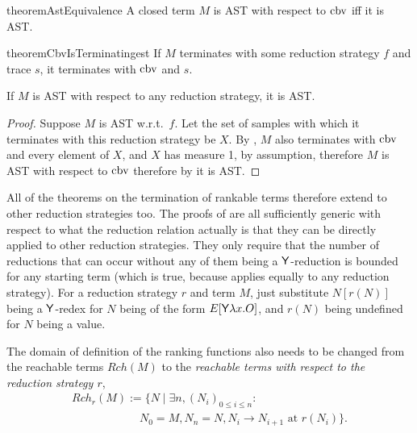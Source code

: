 \begin{restatable}{theorem}{AstEquivalence} \label{thm:AstEquivalence}
A closed term $M$ is AST with respect to $\operatorname{cbv}$ iff it is AST.
\end{restatable}

\begin{restatable}{theorem}{CbvIsTerminatingest} \label{thm:CbvIsTerminatingest}
If $M$ terminates with some reduction strategy $f$ and trace $s$, it terminates with $\operatorname{cbv}$ and $s$.
\end{restatable}

\begin{corollary}
\label{cor:Reduction strategy independence}
If $M$ is AST with respect to any reduction strategy, it is AST.
\end{corollary}
\begin{proof}
Suppose $M$ is AST w.r.t.~$f$. Let the set of samples with which it terminates with this reduction strategy be $X$. By , $M$ also terminates with $\operatorname{cbv}$ and every element of $X$, and $X$ has measure 1, by assumption, therefore $M$ is AST with respect to $\operatorname{cbv}$ therefore by  it is AST.
\end{proof}

All of the theorems on the termination of rankable terms therefore extend to other reduction strategies too. The proofs of  are all sufficiently generic with respect to what the reduction relation actually is that they can be directly applied to other reduction strategies. They only require that the number of reductions that can occur without any of them being a $\mathsf{Y}$-reduction is bounded for any starting term (which is true, because  applies equally to any reduction strategy). For a reduction strategy $r$ and term $M$, just substitute $N[r(N)]$ being a $\mathsf{Y}$-redex for $N$ being of the form $E[\mathsf{Y} \lambda x. O]$, and $r(N)$ being undefined for $N$ being a value.

The domain of definition of the ranking functions also needs to be changed from the reachable terms $\mathit{Rch}(M)$ to the \emph{reachable terms with respect to the reduction strategy $r$},
\[
\begin{array}{l}
\mathit{Rch}_r(M) := \{N \mid \exists n, (N_i)_{0 \leq i \leq n} : {}\\
\qquad\qquad\qquad N_0 = M, N_n = N, N_i \to N_{i+1} \text{ at } r(N_i)\}.
\end{array}
\]

